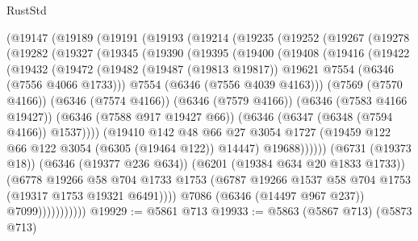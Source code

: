 \begin{lexlean}{RustStd}
\begin{coremodule}
    (@19147
      (@19189
        (@19191
          (@19193
            (@19214
              (@19235
                (@19252
                  (@19267
                    (@19278
                      (@19282
                        (@19327
                          (@19345
                            (@19390
                              (@19395
                                (@19400
                                  (@19408
                                    (@19416
                                      (@19422
                                        (@19432
                                          (@19472
                                            (@19482
                                              (@19487 (@19813 @19817))
                                              @19621
                                              @7554
                                              (@6346 (@7556 @4066 @1733)))
                                            @7554
                                            (@6346 (@7556 @4039 @4163)))
                                          (@7569 (@7570 @4166))
                                          (@6346 (@7574 @4166))
                                          (@6346 (@7579 @4166))
                                          (@6346 (@7583 @4166 @19427))
                                          (@6346 (@7588 @917 @19427 @66))
                                          (@6346 (@6347 (@6348 (@7594 @4166)) @1537))))
                                      (@19410
                                        @142
                                        @48
                                        @66
                                        @27
                                        @3054
                                        @1727
                                        (@19459 @122 @66 @122 @3054 (@6305 (@19464 @122)) @14447)
                                        @19688))))))
                            (@6731 (@19373 @18))
                            (@6346 (@19377 @236 @634))
                            (@6201 (@19384 @634 @20 @1833 @1733))
                            (@6778
                              @19266
                              @58
                              @704
                              @1733
                              @1753
                              (@6787 @19266 @1537 @58 @704 @1753 (@19317 @1753 @19321 @6491))))
                          @7086
                          (@6346 (@14497 @967 @237))
                          @7099)))))))))))
@19929 := @5861 @713
@19933 := @5863 (@5867 @713) (@5873 @713)

\end{coremodule}
\end{lexlean}
